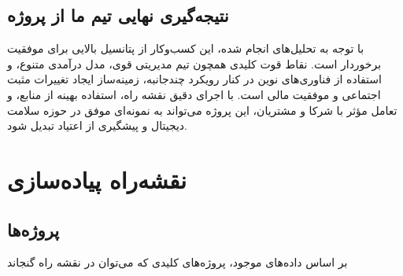 \documentclass[dvipsnames, svgnames, x11names, 11pt]{article}
\begin{document}
\subsection{نتیجه‌گیری نهایی تیم ما از پروژه}
با توجه به تحلیل‌های انجام شده، این کسب‌وکار از پتانسیل بالایی برای موفقیت برخوردار است. نقاط قوت کلیدی همچون تیم مدیریتی قوی، مدل درآمدی متنوع، و استفاده از فناوری‌های نوین در کنار رویکرد چندجانبه، زمینه‌ساز ایجاد تغییرات مثبت اجتماعی و موفقیت مالی است. با اجرای دقیق نقشه راه، استفاده بهینه از منابع، و تعامل مؤثر با شرکا و مشتریان، این پروژه می‌تواند به نمونه‌ای موفق در حوزه سلامت دیجیتال و پیشگیری از اعتیاد تبدیل شود.

\section{نقشه‌راه پیاده‌سازی}
\subsection{پروژه‌ها}
بر اساس داده‌های موجود، پروژه‌های کلیدی که می‌توان در نقشه راه گنجاند
\end{document}
